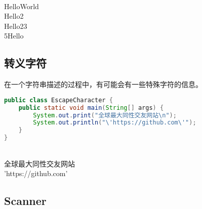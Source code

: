 \begin{tcolorbox}
	 \\
	HelloWorld \\
	Hello2 \\
	Hello23 \\
	5Hello
\end{tcolorbox}

\subsection{转义字符}

在一个字符串描述的过程中，有可能会有一些特殊字符的信息。

\begin{table}[H]
	\centering
	\caption{转义字符}
\end{table}

\begin{lstlisting}[language=Java]
public class EscapeCharacter {
	public static void main(String[] args) {
		System.out.print("全球最大同性交友网站\n");
		System.out.println("\'https://github.com\'");
	}
}
\end{lstlisting}

\begin{tcolorbox}
	 \\
	全球最大同性交友网站 \\
	'https://github.com'
\end{tcolorbox}

\subsection{Scanner}

